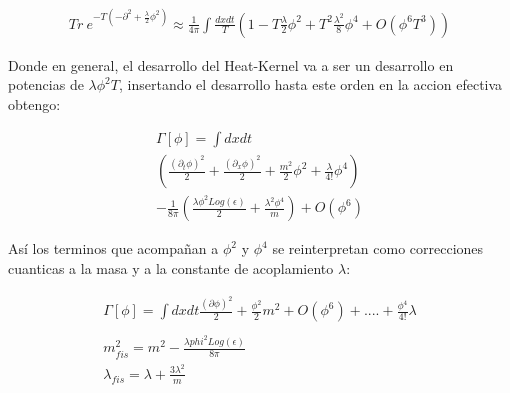 \begin{equation}
\begin{array}{c}
Tr \  e ^{- T ( - \partial ^2 + \frac{\lambda}{2} \phi ^2 ) } \approx
\frac{1}{4 \pi}
\int
\frac{  dx dt }{T}
\left(
1  -
T  \frac{\lambda}{2} \phi ^2  +
T ^2 \frac{\lambda ^2 }{8} \phi ^4 + O ( \phi ^6 T ^3)
\right)

\end{array}
\end{equation}

Donde en general, el desarrollo del Heat-Kernel va a ser un desarrollo en potencias de $ \lambda \phi ^2 T $, insertando el desarrollo hasta este orden en la accion efectiva obtengo:

\begin{comment}

\begin{equation}
\begin{array}{c}
\int _ { \epsilon } ^{\infty} \frac{ dt}{t} 
e ^{- t m ^2 }
Tr \  e ^{- t ( - \partial ^2 + \frac{\lambda}{2} \phi ^2 ) } = \\
\int _ { \epsilon } ^{1} \frac{ dt}{t} 
e ^{- t m ^2 }
Tr \  e ^{- t ( - \partial ^2 + \frac{\lambda}{2} \phi ^2 ) } + 
\int _ { 1 } ^{\infty} \frac{ dt}{t} 
Tr \  e ^{- t ( - \partial ^2 + m^2 + \frac{\lambda}{2} \phi ^2 ) }

\end{array}
\end{equation}

\end{comment}



\begin{equation}
\begin{array}{c}
\Gamma [ \phi ] = 
\int dx dt  \\
\left(
\frac{( \partial _t \phi ) ^2}{2} +  
\frac{( \partial _x \phi ) ^2}{2} +
\frac{m ^2 }{2} \phi ^2 +
\frac{\lambda}{4!} \phi ^4 
						\right)  \\
- \frac{1}{8 \pi}
\left(
	\frac{\lambda \phi ^2 Log( \epsilon )}{2}  + \frac{ \lambda ^2 \phi ^4 }{m}
	\right) + O ( \phi ^6)

\end{array}
\end{equation}

Así los terminos que acompañan a $\phi ^2 $ y $\phi ^4 $ se reinterpretan como correcciones cuanticas a la masa y a la constante de acoplamiento $\lambda $:

\begin{equation}
\begin{array}{c}

\Gamma [ \phi ] = 
\int dx dt 
\frac{ ( \partial \phi ) ^2 }{2 } +
\frac{\phi ^2}{2} m ^2 + O ( \phi ^6 ) + .... 
+ \frac{\phi ^4}{4!} \lambda \\ \\
m ^2 _{fis} = m ^2 - \frac{\lambda phi ^2 Log( \epsilon )}{8 \pi} \\
\lambda _{fis} = \lambda + \frac{3 \lambda ^2}{m} 


\end{array}
\end{equation}

